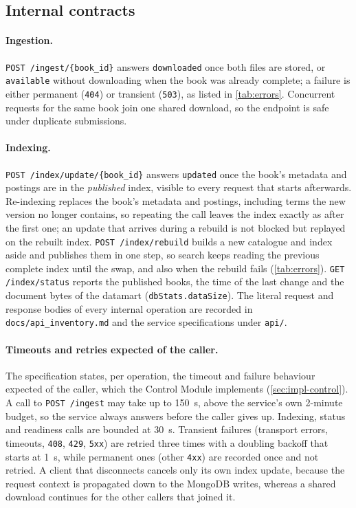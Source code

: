 \documentclass[10pt,a4paper]{article}
\newcommand{\code}[1]{\texttt{#1}}
\newcommand{\route}[1]{\texttt{#1}}
\begin{document}
\subsection{Internal contracts}
\label{sec:internal-contracts}

\paragraph{Ingestion.}
\route{POST /ingest/\allowbreak\{book\_id\}} answers \code{downloaded} once both
files are stored, or \code{available} without downloading when the book was
already complete; a failure is either permanent (\code{404}) or transient
(\code{503}), as listed in \cref{tab:errors}. Concurrent requests for the same
book join one shared download, so the endpoint is safe under duplicate
submissions.

\paragraph{Indexing.}
\route{POST /index/update/\allowbreak\{book\_id\}} answers \code{updated} once the
book's metadata and postings are in the \emph{published} index, visible to every
request that starts afterwards. Re-indexing replaces the book's metadata and
postings, including terms the new version no longer contains, so repeating the
call leaves the index exactly as after the first one; an update that arrives
during a rebuild is not blocked but replayed on the rebuilt index.
\route{POST /index/rebuild} builds a new catalogue and index aside and
publishes them in one step, so search keeps reading the previous complete
index until the swap, and also when the rebuild fails (\cref{tab:errors}).
\route{GET /index/status}
reports the published books, the time of the last change and the document
bytes of the datamart (\code{dbStats.dataSize}). The literal request and
response bodies of every internal operation are recorded in
\code{docs/api\_inventory.md} and the service specifications under \code{api/}.

\paragraph{Timeouts and retries expected of the caller.}
The specification states, per operation, the timeout and failure behaviour
expected of the caller, which the Control Module implements
(\cref{sec:impl-control}). A call to
\route{POST /ingest} may take up to 150~s, above the service's own 2-minute
budget, so the service always answers before the caller gives up. Indexing,
status and readiness calls are bounded at 30~s. Transient failures (transport
errors, timeouts, \code{408}, \code{429}, \code{5xx}) are retried three times
with a doubling backoff that starts at 1~s, while permanent ones (other
\code{4xx}) are recorded once and not retried. A client that disconnects
cancels only its own index update, because the request context is propagated
down to the MongoDB writes, whereas a shared download continues for the other
callers that joined it.
\end{document}
